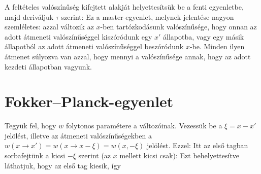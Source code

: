     A feltételes valószínűség kifejtett alakját helyettesítsük be a fenti egyenletbe, majd deriváljuk $\tau$ szerint:
    Ez a master-egyenlet, melynek jelentése nagyon szemléletes: azzal változik az $x$-ben tartózkodásunk valószínűsége, hogy onnan az adott átmeneti valószínűséggel kiszóródunk egy $x'$ állapotba, vagy egy másik állapotból az adott átmeneti valószínűséggel beszóródunk $x$-be. Minden ilyen átmenet súlyozva van azzal, hogy mennyi a valószínűsége annak, hogy az adott kezdeti állapotban vagyunk.
   
   
 \section{Fokker--Planck-egyenlet}
  
  Tegyük fel, hogy $w$ folytonos paramétere a változóinak. Vezessük be a $\xi=x-x'$ jelölést, illetve az átmeneti valószínűségekben a $w(x\to x')=w(x\to x-\xi)=w(x,-\xi)$ jelölést. Ezzel:
  Itt az első tagban sorbafejtünk a kicsi $-\xi$ szerint (az $x$ mellett kicsi csak):
  Ezt behelyettesítve láthatjuk, hogy az első tag kiesik, így
   

